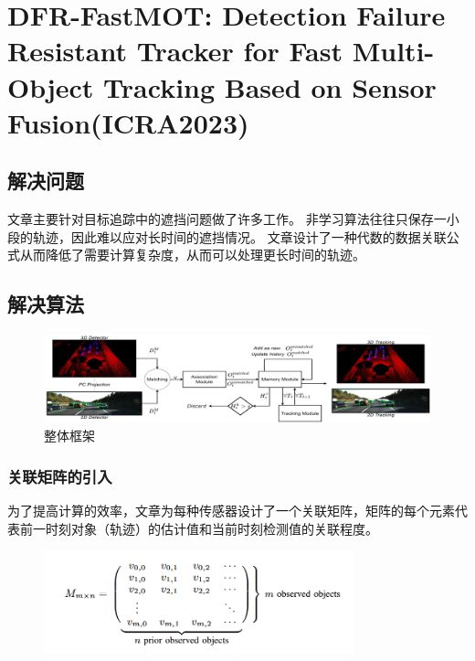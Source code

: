 \chapter{DFR-FastMOT: Detection Failure Resistant Tracker for Fast  Multi-Object Tracking Based on Sensor Fusion(ICRA2023)\cite{10160328}}

\section{解决问题}
文章主要针对目标追踪中的遮挡问题做了许多工作。
非学习算法往往只保存一小段的轨迹，因此难以应对长时间的遮挡情况。
文章设计了一种代数的数据关联公式从而降低了需要计算复杂度，从而可以处理更长时间的轨迹。

\section{解决算法}
\begin{figure}[htbp]
	\centering
	\includegraphics[width=\textwidth]{images/DFRMOT/framework.png}
	\caption{整体框架}
	\label{framework}
\end{figure}

\subsection{关联矩阵的引入}
为了提高计算的效率，文章为每种传感器设计了一个关联矩阵，矩阵的每个元素代表前一时刻对象（轨迹）的估计值和当前时刻检测值的关联程度。

\begin{figure}[H]
	\centering
	\includegraphics[width=0.8\textwidth]{images/DFRMOT/matrix.png}
\end{figure}

